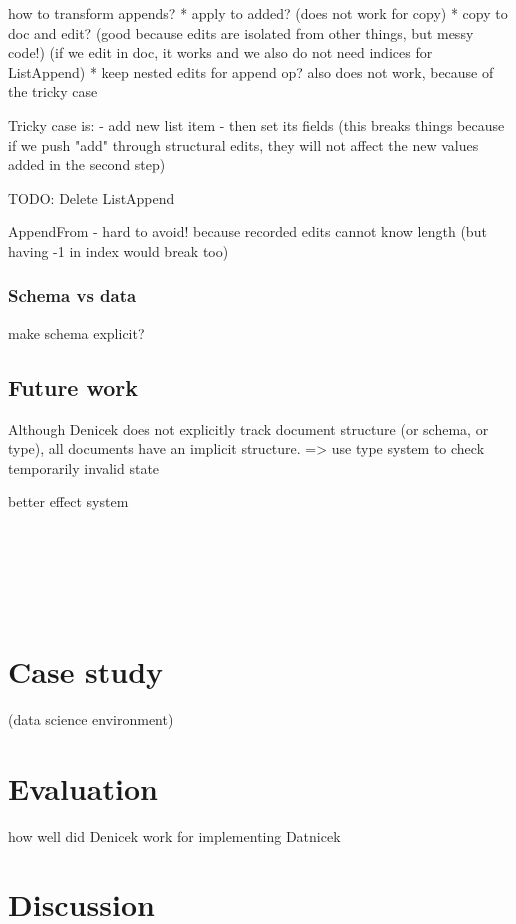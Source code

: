 \documentclass[sigconf,anonymous,screen]{acmart}
\begin{document}
how to transform appends?
* apply to added? (does not work for copy)
* copy to doc and edit? (good because edits are isolated from other things, but messy code!)
(if we edit in doc, it works and we also do not need indices for ListAppend)
* keep nested edits for append op? also does not work, because of the tricky case

Tricky case is:
- add new list item
- then set its fields
  (this breaks things because if we push "add" through structural edits, they will not affect the new values added in the second step)

TODO: Delete ListAppend

AppendFrom - hard to avoid! because recorded edits cannot know length
(but having -1 in index would break too)

\subsubsection*{Schema vs data}
make schema explicit?

\subsection{Future work}
\label{sec:discuss-future}
Although Denicek does not explicitly track document structure (or schema, or type), all documents
have an implicit structure.
=> use type system to check temporarily invalid state

better effect system


~

~

~






\section{Case study}
\label{sec:case}
(data science environment)

\section{Evaluation}
\label{sec:eval}
how well did Denicek work for implementing Datnicek

\section{Discussion}
\end{document}
